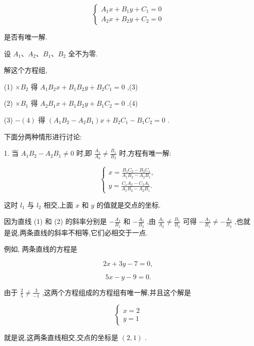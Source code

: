 \documentclass[lang=cn,newtx,10pt,scheme=chinese]{elegantbook}
\begin{document}
\[
  \left\{ \begin{array}{l} {A}_{1}x + {B}_{1}y + {C}_{1} = 0 \\ {A}_{2}x + {B}_{2}y + {C}_{2} = 0 \end{array}\right. \tag{1 2}
\]

是否有唯一解.

设 \({A}_{1}\text{、}{A}_{2}\text{、}{B}_{1}\text{、}{B}_{2}\) 全不为零.

解这个方程组,

(1) \(\times {B}_{2}\) 得 \({A}_{1}{B}_{2}x + {B}_{1}{B}_{2}y + {B}_{2}{C}_{1} = 0\) ,(3)

(2) \(\times {B}_{1}\) 得 \({A}_{2}{B}_{1}x + {B}_{1}{B}_{2}y + {B}_{1}{C}_{2} = 0\) .(4)

(3) \(- \left( 4\right)\) 得 \(\left( {{A}_{1}{B}_{2} - {A}_{2}{B}_{1}}\right) x + {B}_{2}{C}_{1} - {B}_{1}{C}_{2} = 0\) .

下面分两种情形进行讨论:

1. 当 \({A}_{1}{B}_{2} - {A}_{2}{B}_{1} \neq 0\) 时,即 \(\frac{{A}_{1}}{{A}_{2}} \neq \frac{{B}_{1}}{{B}_{2}}\) 时,方程有唯一解:

\[
  \left\{ \begin{array}{l} x = \frac{{B}_{1}{C}_{2} - {B}_{2}{C}_{1}}{{A}_{1}{B}_{2} - {A}_{2}{B}_{1}}, \\ y = \frac{{C}_{1}{A}_{2} - {C}_{2}{A}_{1}}{{A}_{1}{B}_{2} - {A}_{2}{B}_{1}}. \end{array}\right.
\]

这时 \({l}_{1}\) 与 \({l}_{2}\) 相交,上面 \(x\) 和 \(y\) 的值就是交点的坐标.

因为直线 (1) 和 (2) 的斜率分别是 \(- \frac{{A}_{1}}{{B}_{1}}\) 和 \(- \frac{{A}_{2}}{{B}_{2}}\) ,由 \(\frac{{A}_{1}}{{A}_{2}} \neq \frac{{B}_{1}}{{B}_{2}}\) 可得 \(- \frac{{A}_{1}}{{B}_{1}} \neq - \frac{{A}_{2}}{{B}_{2}}\) ,也就是说,两条直线的斜率不相等,它们必相交于一点.

例如, 两条直线的方程是

\[
    {2x} + {3y} - 7 = 0,
\]

\[
    {5x} - y - 9 = 0.
\]

由于 \(\frac{2}{5} \neq \frac{3}{-1}\) ,这两个方程组成的方程组有唯一解,并且这个解是

\[
  \left\{ \begin{array}{l} x = 2 \\ y = 1 \end{array}\right.
\]

就是说,这两条直线相交,交点的坐标是 \(\left( {2,1}\right)\) .
\end{document}
